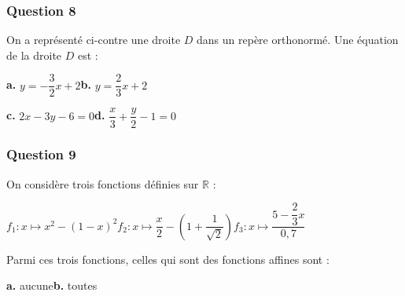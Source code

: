 \subsubsection*{Question 8}

\begin{minipage}[t]{0.6\textwidth}
On a représenté ci-contre une droite $D$ dans un repère orthonormé. Une équation de la droite $D$ est :

\bigskip

\textbf{a.} $y = -\dfrac{3}{2}x + 2$\hfill \textbf{b.} $y = \dfrac{2}{3}x + 2$

\bigskip

\textbf{c.} $2x - 3y - 6 = 0$\hfill \textbf{d.} $\dfrac{x}{3} + \dfrac{y}{2} - 1 = 0$
\end{minipage}
\hfill
\begin{minipage}[t]{0.35\textwidth}
\vspace{0pt}
\begin{center}
\end{center}
\end{minipage}

\subsubsection*{Question 9}
On considère trois fonctions définies sur $\mathbb{R}$ :

$f_1 : x \mapsto x^2 - (1 - x)^2$\hfill $f_2 : x \mapsto \dfrac{x}{2} - \left(1 + \dfrac{1}{\sqrt{2}}\right)$\hfill $f_3 : x \mapsto \dfrac{5 - \dfrac{2}{3}x}{0,7}$

Parmi ces trois fonctions, celles qui sont des fonctions affines sont :

\textbf{a.} aucune\hfill \textbf{b.} toutes

